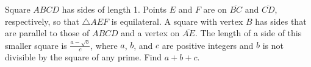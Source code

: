 Square $ABCD$ has sides of length 1. Points $E$ and $F$ are on $\overline{BC}$ and $\overline{CD}$, respectively, so that $\triangle AEF$ is equilateral. A square with vertex $B$ has sides that are parallel to those of $ABCD$ and a vertex on $\overline{AE}$. The length of a side of this smaller square is $\displaystyle \frac{a-\sqrt{b}}{c}$, where $a$, $b$, and $c$ are positive integers and $b$ is not divisible by the square of any prime. Find $a+b+c$.